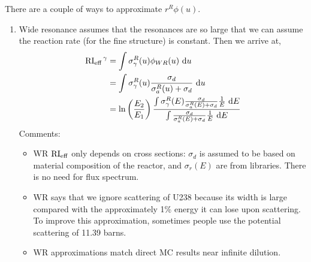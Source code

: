 \documentclass{school-22.211-notes}
\begin{document}
There are a couple of ways to approximate $r^R \phi(u)$. 
\begin{enumerate}
\item Wide resonance assumes that the resonances are so large that we can assume the reaction rate (for the fine structure) is constant. 
Then we arrive at, 
\begin{align}
\left. \mathrm{RI}_{\mathrm{eff}} \right.^{\gamma} &= \int \sigma_{\gamma}^R (u) \phi_{WR} (u) \mbox{ }\mathrm{d} u \\
&= \int \sigma_{\gamma}^R (u) \frac{\sigma_d}{\sigma_a^R(u) + \sigma_d} \mbox{ }\mathrm{d} u \\
&= \ln\left( \frac{E_2}{E_1} \right) \frac{ \int \sigma_{\gamma}^R (E) \frac{\sigma_d}{\sigma_{a}^R(E) + \sigma_d} \frac{1}{E} \mbox{ }\mathrm{d} E}{ \int \frac{\sigma_d}{\sigma_{a}^R(E) + \sigma_d} \frac{1}{E} \mbox{ }\mathrm{d} E}
\end{align}
Comments:
\begin{itemize}
\item WR $\mathrm{RI}_{\mathrm{eff}}$ only depends on cross sections: $\sigma_d$ is assumed to be based on material composition of the reactor, and $\sigma_r(E)$ are from libraries. There is no need for flux spectrum. 

\item WR says that we ignore scattering of U238 because its width is large compared with the approximately 1\% energy it can lose upon scattering. To improve this approximation, sometimes people use the potential scattering of 11.39 barns. 

\item WR approximations match direct MC results near infinite dilution. 
\end{itemize}




\end{enumerate}
\end{document}
